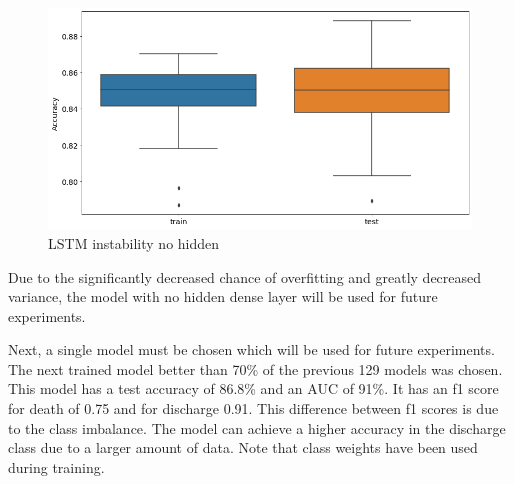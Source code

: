 \documentclass[12pt]{article}
\begin{document}
\begin{figure}[H]
\centering\caption{LSTM instability no hidden}
\includegraphics[scale=0.4]{LSTM instability no hidden.png}
\end{figure}
Due to the significantly decreased chance of overfitting and greatly decreased variance, the model with no hidden dense layer will be used for future experiments. 

Next, a single model must be chosen which will be used for future experiments. The next trained model better than 70\% of the previous 129 models was chosen. This model has a test accuracy of 86.8\% and an AUC of 91\%. It has an f1 score for death of 0.75 and for discharge 0.91. This difference between f1 scores is due to the class imbalance. The model can achieve a higher accuracy in the discharge class due to a larger amount of data. Note that class weights have been used during training. 

\end{document}
